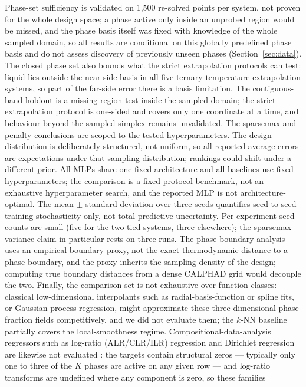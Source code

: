 \documentclass[preprint,12pt,authoryear]{elsarticle}
\begin{document}
Phase-set sufficiency is validated on 1{,}500 re-solved points per system,
not proven
for the whole design space; a phase active only inside an unprobed region
would be missed, and the phase basis itself was fixed with knowledge of the
whole sampled domain, so all results are conditional on this globally
predefined phase basis and do not assess discovery of previously unseen
phases (Section~\ref{sec:data}). The closed phase set also bounds what the
strict extrapolation protocols can test: liquid lies outside the near-side
basis in all five ternary temperature-extrapolation systems, so part of the
far-side error there is a basis limitation. The contiguous-band holdout
is a missing-region test inside the sampled domain; the strict
extrapolation protocol is one-sided and covers only one coordinate at a
time, and behaviour beyond the sampled simplex remains unvalidated. The
sparsemax and penalty conclusions are scoped to the tested hyperparameters.
The design distribution is deliberately structured, not uniform, so all
reported average errors are expectations under that sampling distribution;
rankings could shift under a different prior. All MLPs share one fixed
architecture and all baselines use fixed hyperparameters; the comparison is
a fixed-protocol benchmark, not an exhaustive hyperparameter search, and
the reported MLP is not architecture-optimal. The mean $\pm$ standard
deviation over three seeds quantifies seed-to-seed training stochasticity
only, not total predictive uncertainty. Per-experiment seed counts are
small (five for the two tied systems, three elsewhere); the sparsemax variance claim in particular rests on three runs. The
phase-boundary analysis uses an
empirical boundary proxy, not the exact thermodynamic distance to a phase
boundary, and the proxy inherits the sampling density of the design;
computing true boundary distances from a dense CALPHAD grid would decouple
the two. Finally, the comparison set is not
exhaustive over function classes: classical low-dimensional interpolants
such as radial-basis-function or spline fits, or Gaussian-process
regression, might approximate these three-dimensional phase-fraction fields
competitively, and we did not evaluate them; the $k$-NN baseline partially
covers the local-smoothness regime. Compositional-data-analysis regressors
such as log-ratio (ALR/CLR/ILR) regression and Dirichlet regression are
likewise not evaluated \citep{meloni2026coda,parent2025nutrition}: the targets contain structural zeros --- typically only one
to three of the $K$ phases are active on any given row --- and log-ratio
transforms are undefined where any component is zero, so these families
\end{document}
